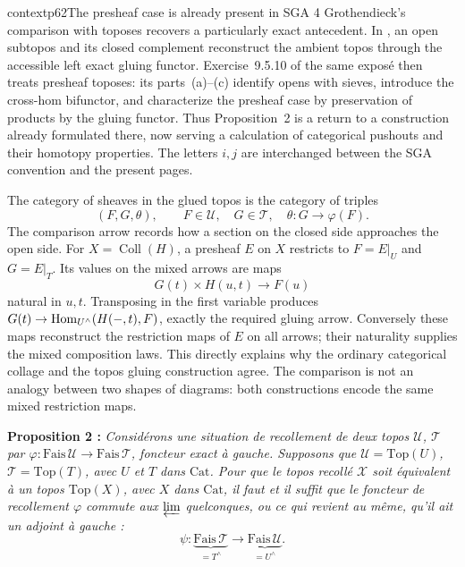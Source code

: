 \begin{dcomment}{context}{p62}{The presheaf case is already present in SGA 4}
Grothendieck's comparison with toposes recovers a particularly exact antecedent. In \citet[Expos\'e~IV, Theorem~9.5.4]{SGA4I1972}, an open subtopos and its closed complement reconstruct the ambient topos through the accessible left exact gluing functor. Exercise~9.5.10 of the same expos\'e then treats presheaf toposes: its parts~(a)--(c) identify opens with sieves, introduce the cross-hom bifunctor, and characterize the presheaf case by preservation of products by the gluing functor. Thus Proposition~2 is a return to a construction already formulated there, now serving a calculation of categorical pushouts and their homotopy properties. The letters $i,j$ are interchanged between the SGA convention and the present pages.

The category of sheaves in the glued topos is the category of triples
\[
 (F,G,\theta),\qquad F\in\mathcal U,\quad G\in\mathcal T,
 \quad\theta:G\longrightarrow\varphi(F).
\]
The comparison arrow records how a section on the closed side approaches the open side. For $X=\operatorname{Coll}(H)$, a presheaf $E$ on $X$ restricts to $F=E|_U$ and $G=E|_T$. Its values on the mixed arrows are maps
\[
 G(t)\times H(u,t)\longrightarrow F(u)
\]
natural in $u,t$. Transposing in the first variable produces $G(t)\to\mathrm{Hom}_{U^\wedge}(H(-,t),F)$, exactly the required gluing arrow. Conversely these maps reconstruct the restriction maps of $E$ on all arrows; their naturality supplies the mixed composition laws. This directly explains why the ordinary categorical collage and the topos gluing construction agree. The comparison is not an analogy between two shapes of diagrams: both constructions encode the same mixed restriction maps.
\end{dcomment}


\textbf{Proposition 2 :} \textit{Considérons une situation de recollement de deux topos $\mathcal{U}$, $\mathcal{T}$ par $\varphi : \mathrm{Fais}\,\mathcal{U} \longrightarrow \mathrm{Fais}\,\mathcal{T}$, foncteur exact à gauche. Supposons que $\mathcal{U} = \mathrm{Top}(U)$, $\mathcal{T} = \mathrm{Top}(T)$, avec $U$ et $T$ dans $\mathrm{Cat}$. Pour que le topos recollé $\mathcal{X}$ soit équivalent à un topos $\mathrm{Top}(X)$, avec $X$ dans $\mathrm{Cat}$, il faut et il suffit que le foncteur de recollement $\varphi$ commute aux $\varprojlim$ quelconques, ou ce qui revient au même, qu'il ait un adjoint à gauche :}
\[
\psi : \underbrace{\mathrm{Fais}\,\mathcal{T}}_{= T^\wedge} \longrightarrow \underbrace{\mathrm{Fais}\,\mathcal{U}}_{= U^\wedge}.
\]

